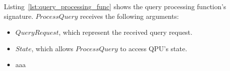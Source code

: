 \noindent
Listing~\ref{lst:query_processing_func} shows the query processing function's signature.
$ProcessQuery$ receives the following arguments:
\begin{itemize}

  \item $QueryRequest$, which represent the received query request.
  \item $State$, which allows $ProcessQuery$ to access QPU's state.







  \item aaa
\end{itemize}









